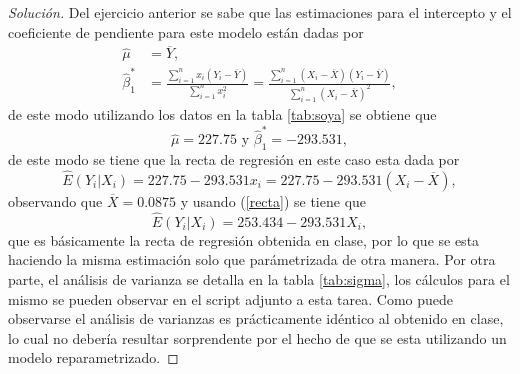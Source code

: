 \documentclass[10.5pt,notitlepage]{article}
\newenvironment{solucion}
  {\begin{proof}[Solución]}
  {\end{proof}}
\begin{document}
\begin{solucion}
Del ejercicio anterior se sabe que las estimaciones para el intercepto y el coeficiente de pendiente para este modelo están dadas por
\begin{align*}
    \hat{\mu} &= \overline{Y}, \\
    \hat{\beta}_{1}^{*} &= \frac{\sum_{i=1}^{n}x_i (Y_i-\overline{Y})}{\sum_{i=1}^{n}x_i^2} =\frac{\sum_{i=1}^{n}(X_i - \overline{X})(Y_i- \overline{Y})}{\sum_{i=1}^{n}(X_i - \overline{X})^2}, 
\end{align*}
de este modo utilizando los datos en la tabla \ref{tab:soya} se obtiene que 
\begin{equation}\label{coefs}
    \hat{\mu} = 227.75 \text{ y } \hat{\beta}_{1}^{*} = -293.531,
\end{equation}
de este modo se tiene que la recta de regresión en este caso esta dada por 
\begin{equation}\label{recta}
    \widehat{E}(Y_i|X_i) = 227.75 -293.531 x_i = 227.75 - 293.531(X_i - \overline{X}), 
\end{equation}
observando que \(\overline{X} = 0.0875\) y usando (\ref{recta}) se tiene que 
\begin{equation}\label{recta2}
    \widehat{E}(Y_i|X_i) =  253.434-293.531 X_i , 
\end{equation}
que es básicamente la recta de regresión obtenida en clase, por lo que se esta haciendo la misma estimación solo que parámetrizada de otra manera. Por otra parte, el análisis de varianza se detalla en la tabla \ref{tab:sigma}, los cálculos para el mismo se pueden observar en el script adjunto a esta tarea. Como puede observarse el análisis de varianzas es prácticamente idéntico al obtenido en clase, lo cual no debería resultar sorprendente por el hecho de que se esta utilizando un modelo reparametrizado. 
\begin{table}[htb]
    \centering
    \caption{Análisis de Varianzas Rendimiento de Soya.}
    \label{tab:sigma}
\end{table}

\end{solucion}
\end{document}
